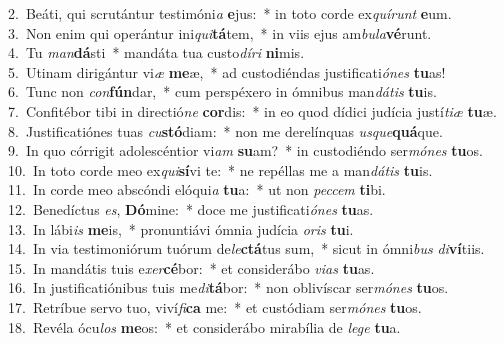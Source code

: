 {2.~}Beáti, qui scrutántur testimóni\textit{a} \textbf{e}jus:~* in toto corde ex\textit{quí}\textit{runt} \textbf{e}um.\\
{3.~}Non enim qui operántur ini\textit{qui}\textbf{tá}tem,~* in viis ejus am\textit{bu}\textit{la}\textbf{vé}runt.\\
{4.~}Tu \textit{man}\textbf{dá}sti~* mandáta tua custo\textit{dí}\textit{ri} \textbf{ni}mis.\\
{5.~}Utinam dirigántur vi\textit{æ} \textbf{me}æ,~* ad custodiéndas justificati\textit{ó}\textit{nes} \textbf{tu}as!\\
{6.~}Tunc non \textit{con}\textbf{fún}dar,~* cum perspéxero in ómnibus man\textit{dá}\textit{tis} \textbf{tu}is.\\
{7.~}Confitébor tibi in directió\textit{ne} \textbf{cor}dis:~* in eo quod dídici judícia justí\textit{ti}\textit{æ} \textbf{tu}æ.\\
{8.~}Justificatiónes tuas \textit{cu}\textbf{stó}diam:~* non me derelínquas \textit{us}\textit{que}\textbf{quá}que.\\
{9.~}In quo córrigit adolescéntior vi\textit{am} \textbf{su}am?~* in custodiéndo ser\textit{mó}\textit{nes} \textbf{tu}os.\\
{10.~}In toto corde meo ex\textit{qui}\textbf{sí}vi te:~* ne repéllas me a man\textit{dá}\textit{tis} \textbf{tu}is.\\
{11.~}In corde meo abscóndi elóqui\textit{a} \textbf{tu}a:~* ut non \textit{pec}\textit{cem} \textbf{ti}bi.\\
{12.~}Benedíctus \textit{es}, \textbf{Dó}mine:~* doce me justificati\textit{ó}\textit{nes} \textbf{tu}as.\\
{13.~}In lábi\textit{is} \textbf{me}is,~* pronuntiávi ómnia judícia \textit{o}\textit{ris} \textbf{tu}i.\\
{14.~}In via testimoniórum tuórum de\textit{le}\textbf{ctá}tus sum,~* sicut in ómni\textit{bus} \textit{di}\textbf{ví}tiis.\\
{15.~}In mandátis tuis e\textit{xer}\textbf{cé}bor:~* et considerábo \textit{vi}\textit{as} \textbf{tu}as.\\
{16.~}In justificatiónibus tuis me\textit{di}\textbf{tá}bor:~* non oblivíscar ser\textit{mó}\textit{nes} \textbf{tu}os.\\
{17.~}Retríbue servo tuo, viví\textit{fi}\textbf{ca} me:~* et custódiam ser\textit{mó}\textit{nes} \textbf{tu}os.\\
{18.~}Revéla ócu\textit{los} \textbf{me}os:~* et considerábo mirabília de \textit{le}\textit{ge} \textbf{tu}a.\\
